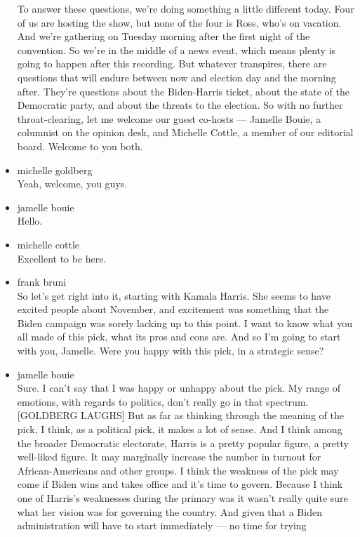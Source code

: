 \begin{itemize}
  To answer these questions, we're doing something a little different
  today. Four of us are hosting the show, but none of the four is Ross,
  who's on vacation. And we're gathering on Tuesday morning after the
  first night of the convention. So we're in the middle of a news event,
  which means plenty is going to happen after this recording. But
  whatever transpires, there are questions that will endure between now
  and election day and the morning after. They're questions about the
  Biden-Harris ticket, about the state of the Democratic party, and
  about the threats to the election. So with no further throat-clearing,
  let me welcome our guest co-hosts --- Jamelle Bouie, a columnist on
  the opinion desk, and Michelle Cottle, a member of our editorial
  board. Welcome to you both.
\item
  michelle goldberg\\
  Yeah, welcome, you guys.
\item
  jamelle bouie\\
  Hello.
\item
  michelle cottle\\
  Excellent to be here.
\item
  frank bruni\\
  So let's get right into it, starting with Kamala Harris. She seems to
  have excited people about November, and excitement was something that
  the Biden campaign was sorely lacking up to this point. I want to know
  what you all made of this pick, what its pros and cons are. And so I'm
  going to start with you, Jamelle. Were you happy with this pick, in a
  strategic sense?
\item
  jamelle bouie\\
  Sure. I can't say that I was happy or unhappy about the pick. My range
  of emotions, with regards to politics, don't really go in that
  spectrum. {[}GOLDBERG LAUGHS{]} But as far as thinking through the
  meaning of the pick, I think, as a political pick, it makes a lot of
  sense. And I think among the broader Democratic electorate, Harris is
  a pretty popular figure, a pretty well-liked figure. It may marginally
  increase the number in turnout for African-Americans and other groups.
  I think the weakness of the pick may come if Biden wins and takes
  office and it's time to govern. Because I think one of Harris's
  weaknesses during the primary was it wasn't really quite sure what her
  vision was for governing the country. And given that a Biden
  administration will have to start immediately --- no time for trying

\end{itemize}
